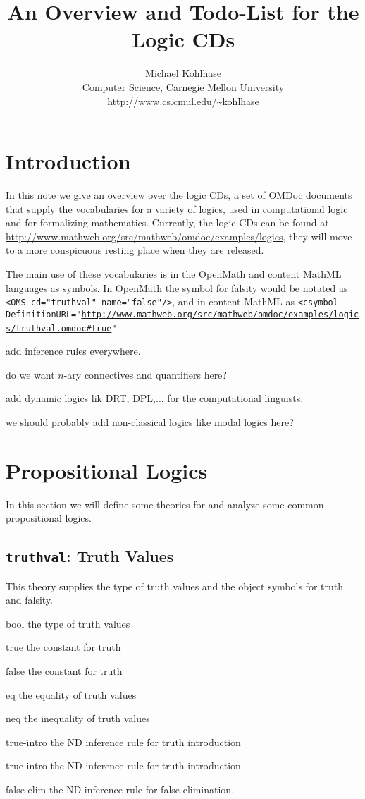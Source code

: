 \documentclass{article}
\title{An Overview and Todo-List for the Logic CDs}
\author{Michael Kohlhase\\ 
Computer Science, Carnegie Mellon University\\
\url{http://www.cs.cmul.edu/~kohlhase}}
\def\openmath{{\sc OpenMath}}
\def\omdoc{{\sc OMDoc}}
\def\mathml{{\sc MathML}}
\begin{document}
\maketitle

\section{Introduction}
In this note we give an overview over the logic CDs, a set of {\omdoc} documents
that supply the vocabularies for a variety of logics, used in computational logic
and for formalizing mathematics.  Currently, the logic CDs can be found at
{\url{http://www.mathweb.org/src/mathweb/omdoc/examples/logics}}, they will move
to a more conspicuous resting place when they are released. 

The main use of these vocabularies is in the {\openmath} and content {\mathml}
languages as symbols. In {\openmath} the symbol for falsity would be notated as 
{\tt{<OMS cd="truthval" name="false"/>}}, and in content {\mathml} as
{\tt{<csymbol DefinitionURL="\url{http://www.mathweb.org/src/mathweb/omdoc/examples/logics/truthval.omdoc#true}"}}.

\begin{todolist}{}
\item add inference rules everywhere. 
\item do we want $n$-ary connectives and quantifiers here?
\item add dynamic logics lik DRT, DPL,... for the computational linguists.
\item we should probably add non-classical logics like modal logics here?
\end{todolist}

 \section{Propositional Logics}
 In this section we will define some theories for and analyze some common
 propositional logics.

\subsection{{\tt{truthval}}: Truth Values}
This theory supplies the type of truth values and the object symbols for truth and
falsity. 

\begin{constlist}
  \item[bool] the type of truth values
  \item[true] the constant for truth
  \item[false] the constant for truth
  \item[eq] the equality of truth values
  \item[neq] the inequality of truth values
  \item[true-intro] the ND inference rule for truth introduction
  \item[true-intro] the ND inference rule for truth introduction
  \item[false-elim] the ND inference rule for false elimination.
\end{constlist}
  
\end{document}
